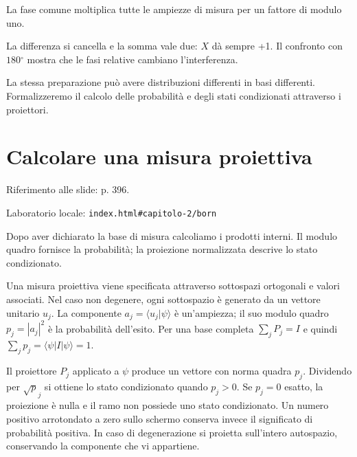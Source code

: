 La fase comune moltiplica tutte le ampiezze di misura per un fattore di modulo uno.\par



La differenza si cancella e la somma vale due: \(X\) dà sempre +1. Il confronto con \(180{}^{\circ} \) mostra che le fasi relative cambiano l'interferenza.\par


La stessa preparazione può avere distribuzioni differenti in basi differenti. Formalizzeremo il calcolo delle probabilità e degli stati condizionati attraverso i proiettori.\par


\Needspace{.43\textheight}
\section{Calcolare una misura proiettiva}
\label{c2-born}

{\sffamily\small\color{Ink!70} Riferimento alle slide: p. 396.\par}

{\sffamily\small\color{Ink!70} Laboratorio locale: \nolinkurl{index.html#capitolo-2/born}\par}

Dopo aver dichiarato la base di misura calcoliamo i prodotti interni. Il modulo quadro fornisce la probabilità; la proiezione normalizzata descrive lo stato condizionato.\par

Una misura proiettiva viene specificata attraverso sottospazi ortogonali e valori associati. Nel caso non degenere, ogni sottospazio è generato da un vettore unitario \(u_{j}\). La componente \(a_{j}=\langle u_{j}|\psi \rangle \) è un'ampiezza; il suo modulo quadro \(p_{j}=|a_{j}|^{2}\) è la probabilità dell'esito. Per una base completa \(\sum _{j}P_{j}=I\) e quindi \(\sum _{j}p_{j}=\langle \psi |I|\psi \rangle =1\).\par

Il proiettore \(P_{j}\) applicato a \(\psi \) produce un vettore con norma quadra \(p_{j}\). Dividendo per \(\sqrt{p}_{j}\) si ottiene lo stato condizionato quando \(p_{j}>0\). Se \(p_{j}=0\) esatto, la proiezione è nulla e il ramo non possiede uno stato condizionato. Un numero positivo arrotondato a zero sullo schermo conserva invece il significato di probabilità positiva. In caso di degenerazione si proietta sull'intero autospazio, conservando la componente che vi appartiene.\par

